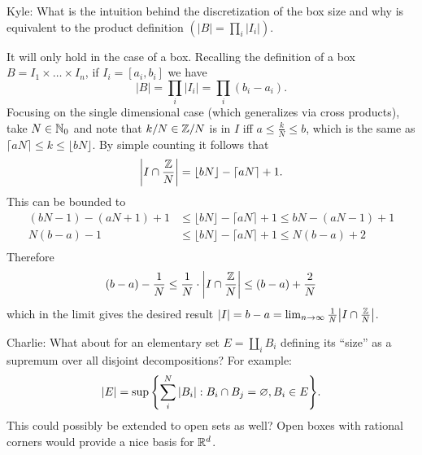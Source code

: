 \documentclass[main.tex]{subfiles}
\begin{document}
\begin{que}
    Kyle: What is the intuition behind the discretization of the box size and why is equivalent to the product definition $(|B| = \prod_i |I_i|)$.
\end{que}

\begin{ans}
    It will only hold in the case of a box. Recalling the definition of a box $B = I_1 \times \ldots \times I_n$, if $I_i = [a_i, b_i]$ we have
    \[
        |B| = \prod_i |I_i| = \prod_i (b_i - a_i)
    .\]
    Focusing on the single dimensional case (which generalizes via cross products), take $N \in \mathbb{N}_0$ and note that $k / N \in \mathbb{Z} / N$ is in $I$ iff $a \leq \frac{k}{N} \leq b$, which is the same as $\lceil aN \rceil \leq k \leq \lfloor bN \rfloor$. By simple counting it follows that
    \[
        \qty|I \cap \frac{\mathbb{Z}}{N}| = \lfloor bN \rfloor - \lceil aN \rceil + 1
    .\]
    This can be bounded to 
    \begin{align*}
        (bN - 1) - (aN + 1) + 1 &\leq \lfloor bN \rfloor - \lceil aN \rceil + 1 \leq bN - (aN - 1) + 1 \\
        N(b-a) - 1  &\leq \lfloor bN \rfloor - \lceil aN \rceil + 1 \leq N(b-a) + 2 \\
    \end{align*}
    Therefore
    \[
        (b-a) - \frac{1}{N} \leq \frac{1}{N} \cdot \qty|I \cap \frac{\mathbb{Z}}{N}| \leq (b-a) + \frac{2}{N}
    \]
    which in the limit gives the desired result $|I| = b - a = \lim_{n \to \infty} \frac{1}{N} \qty|I \cap \frac{\mathbb{Z}}{N}|$.
\end{ans}

\begin{remark}
    Charlie: What about for an elementary set $E = \coprod_i B_i$ defining its ``size'' as a supremum over all disjoint decompositions? For example:
    \[
        |E| = \sup \qty{\sum_i^N |B_i| : B_i \cap B_j = \varnothing, B_i \in E}
    .\]
    This could possibly be extended to open sets as well? Open boxes with rational corners would provide a nice basis for $\mathbb{R}^d$.
\end{remark}
\end{document}
